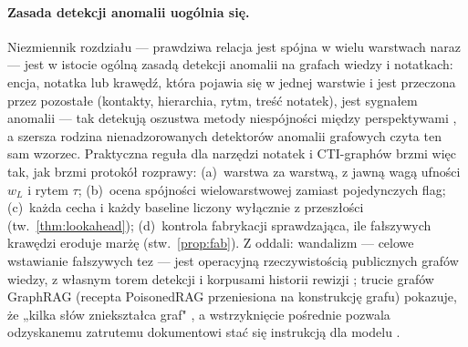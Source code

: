 \paragraph{Zasada detekcji anomalii uogólnia się.} Niezmiennik
rozdziału --- prawdziwa relacja jest spójna w wielu warstwach
naraz --- jest w istocie ogólną zasadą detekcji anomalii
na grafach wiedzy i notatkach: encja, notatka lub krawędź,
która pojawia się w jednej warstwie i jest przeczona przez
pozostałe (kontakty, hierarchia, rytm, treść notatek), jest
sygnałem anomalii --- tak detekują oszustwa metody
niespójności między perspektywami \citep{liu2020alleviating},
a szersza rodzina nienadzorowanych detektorów anomalii
grafowych \citep{akoglu2015graph,liu2021anomaly,li2025umgad,
behrouz2022anomaly} czyta ten sam wzorzec. Praktyczna reguła
dla narzędzi notatek i CTI-graphów brzmi więc tak, jak brzmi
protokół rozprawy: (a)~warstwa za warstwą, z jawną wagą ufności
$w_L$ i rytem $\tau$; (b)~ocena spójności wielowarstwowej zamiast
pojedynczych flag; (c)~każda cecha i każdy baseline liczony
wyłącznie z przeszłości (tw.~\ref{thm:lookahead}); (d)~kontrola
fabrykacji sprawdzająca, ile fałszywych krawędzi eroduje marżę
(stw.~\ref{prop:fab}). Z oddali: wandalizm --- celowe wstawianie
fałszywych tez --- jest operacyjną rzeczywistością publicznych
grafów wiedzy, z własnym torem detekcji
\citep{heindorf2017wsdmcup,sarabadani2017tools,heindorf2019debiasing}
i korpusami historii rewizji \citep{schmelzeisen2022wikidated};
trucie grafów GraphRAG (recepta PoisonedRAG przeniesiona na
konstrukcję grafu) pokazuje, że „kilka słów zniekształca graf"
\citep{wen2025fewwords,kepo2026,zou2024poisonedrag}, a wstrzyknięcie
pośrednie pozwala odzyskanemu zatrutemu dokumentowi stać się
instrukcją dla modelu \citep{greshake2023not}.

